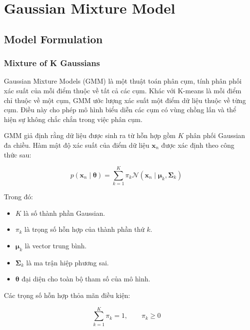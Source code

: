\documentclass[12pt,a4paper]{article}
\begin{document}
\setcounter{section}{2}

\section{Gaussian Mixture Model}

\subsection{Model Formulation}

\subsubsection*{Mixture of K Gaussians}

Gaussian Mixture Models (GMM) là một thuật toán phân cụm,
tính phân phối xác suất của mỗi điểm thuộc về tất cả các cụm.
Khác với K-means là mỗi điểm chỉ thuộc về một cụm, GMM
ước lượng xác suất một điểm dữ liệu thuộc về từng cụm.
Điều này cho phép mô hình biểu diễn các cụm có vùng chồng lấn
và thể hiện sự không chắc chắn trong việc phân cụm.

GMM giả định rằng dữ liệu được sinh ra từ hỗn hợp gồm
$K$ phân phối Gaussian đa chiều. Hàm mật độ xác suất của
điểm dữ liệu $\bm{x}_n$ được xác định theo công thức sau:

\begin{equation}
p(\bm{x}_n \mid \boldsymbol{\theta})
=
\sum_{k=1}^{K}
\pi_k
\mathcal{N}(\bm{x}_n \mid \bm{\mu}_k,\boldsymbol{\Sigma}_k)
\end{equation}

Trong đó:
\begin{itemize}[leftmargin=1.5cm]
    \item $K$ là số thành phần Gaussian.
    \item $\pi_k$ là trọng số hỗn hợp của thành phần thứ $k$.
    \item $\bm{\mu}_k$ là vector trung bình.
    \item $\boldsymbol{\Sigma}_k$ là ma trận hiệp phương sai.
    \item $\boldsymbol{\theta}$ đại diện cho toàn bộ tham số
    của mô hình.
\end{itemize}

Các trọng số hỗn hợp thỏa mãn điều kiện:

\begin{equation}
\sum_{k=1}^{K}\pi_k=1,
\qquad \pi_k \geq 0
\end{equation}
\end{document}
